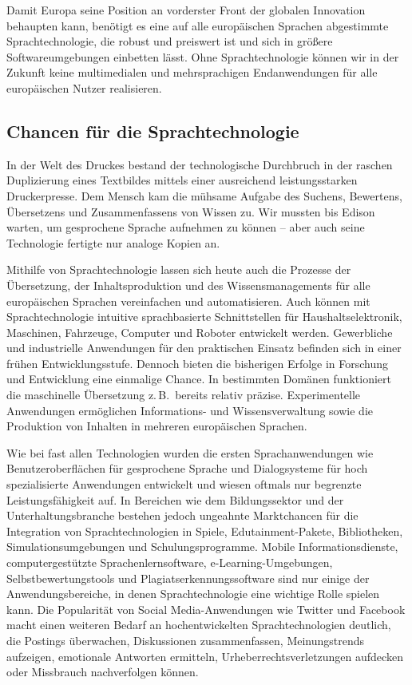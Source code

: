 \documentclass[]{../../metanetpaper}
\begin{document}
\begin{multicols}{2}
Damit Europa seine Position an vorderster Front der globalen Innovation behaupten kann, benötigt es eine auf alle europäischen Sprachen abgestimmte Sprachtechnologie, die robust und preiswert ist und sich in größere Softwareumgebungen einbetten lässt. Ohne Sprachtechnologie können wir in der Zukunft keine multimedialen und mehrsprachigen Endanwendungen für alle europäischen Nutzer realisieren.

\subsection{Chancen für die Sprachtechnologie}

In der Welt des Druckes bestand der technologische Durchbruch in der raschen Duplizierung eines Textbildes mittels einer ausreichend leistungsstarken Druckerpresse. Dem Mensch kam die mühsame Aufgabe des Suchens, Bewertens, Übersetzens und Zusammenfassens von Wissen zu. Wir mussten bis Edison warten, um gesprochene Sprache aufnehmen zu können -- aber auch seine Technologie fertigte nur analoge Kopien an.

Mithilfe von Sprachtechnologie lassen sich heute auch die Prozesse der Übersetzung, der Inhaltsproduktion und des Wissensmanagements für alle europäischen Sprachen vereinfachen und automatisieren. Auch können mit Sprachtechnologie intuitive sprachbasierte Schnittstellen für Haushaltselektronik, Maschinen, Fahrzeuge, Computer und Roboter entwickelt werden. Gewerbliche und industrielle Anwendungen für den praktischen Einsatz befinden sich in einer frühen Entwicklungsstufe. Dennoch bieten die bisherigen Erfolge in Forschung und Entwicklung eine einmalige Chance. In bestimmten Domänen funktioniert die maschinelle Übersetzung z.\,B.~bereits relativ präzise. Experimentelle Anwendungen ermöglichen Informations- und Wissensverwaltung sowie die Produktion von Inhalten in mehreren europäischen Sprachen.

Wie bei fast allen Technologien wurden die ersten Sprachanwendungen wie Benutzeroberflächen für gesprochene Sprache und Dialogsysteme für hoch spezialisierte Anwendungen entwickelt und wiesen oftmals nur begrenzte Leistungsfähigkeit auf. In Bereichen wie dem Bildungssektor und der Unterhaltungsbranche bestehen jedoch ungeahnte Marktchancen für die Integration von Sprachtechnologien in Spiele, Edu\-tain\-ment-Pa\-ke\-te, Bibliotheken, Simulationsumgebungen und Schulungsprogramme. Mobile Informationsdienste, computergestützte Sprachenlernsoftware, e-Learn\-ing-Um\-ge\-bungen, Selbstbewertungstools und Plagiatserkennungssoftware sind nur einige der Anwendungsbereiche, in denen Sprachtechnologie eine wichtige Rolle spielen kann. Die Popularität von Social Me\-dia-An\-wen\-dungen wie Twitter und Facebook macht einen weiteren Bedarf an hochentwickelten Sprachtechnologien deutlich, die Postings überwachen, Diskussionen zusammenfassen, Meinungstrends aufzeigen, emotionale Antworten ermitteln, Urheberrechtsverletzungen aufdecken oder Missbrauch nachverfolgen können.


\end{multicols}
\end{document}
